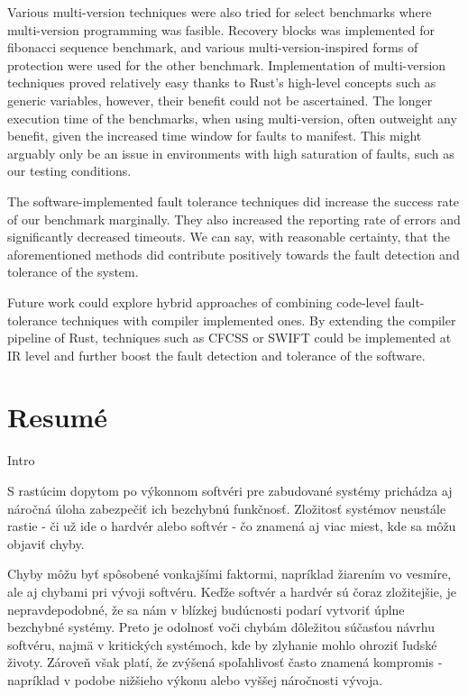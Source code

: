 \documentclass[12pt, letterpaper]{article}
\begin{document}
Various multi-version techniques were also tried for select benchmarks where multi-version programming was fasible. Recovery blocks was implemented for fibonacci sequence benchmark, and various multi-version-inspired forms of protection were used for the other benchmark. Implementation of multi-version techniques proved relatively easy thanks to Rust's high-level concepts such as generic variables, however, their benefit could not be ascertained. The longer execution time of the benchmarks, when using multi-version, often outweight any benefit, given the increased time window for faults to manifest. This might arguably only be an issue in environments with high saturation of faults, such as our testing conditions.

The software-implemented fault tolerance techniques did increase the success rate of our benchmark marginally. They also increased the reporting rate of errors and significantly decreased timeouts. We can say, with reasonable certainty, that the aforementioned methods did contribute positively towards the fault detection and tolerance of the system.

Future work could explore hybrid approaches of combining code-level fault-tolerance techniques with compiler implemented ones. By extending the compiler pipeline of Rust, techniques such as CFCSS or SWIFT could be implemented at IR level and further boost the fault detection and tolerance of the software.



\clearpage
\section{Resumé}

Intro

S rastúcim dopytom po výkonnom softvéri pre zabudované systémy prichádza aj náročná úloha zabezpečiť ich bezchybnú funkčnosť. Zložitosť systémov neustále rastie - či už ide o hardvér alebo softvér - čo znamená aj viac miest, kde sa môžu objaviť chyby.

Chyby môžu byť spôsobené vonkajšími faktormi, napríklad žiarením vo vesmíre, ale aj chybami pri vývoji softvéru. Keďže softvér a hardvér sú čoraz zložitejšie, je nepravdepodobné, že sa nám v blízkej budúcnosti podarí vytvoriť úplne bezchybné systémy. Preto je odolnosť voči chybám dôležitou súčasťou návrhu softvéru, najmä v kritických systémoch, kde by zlyhanie mohlo ohroziť ľudské životy. Zároveň však platí, že zvýšená spoľahlivosť často znamená kompromis - napríklad v podobe nižšieho výkonu alebo vyššej náročnosti vývoja.
\end{document}
